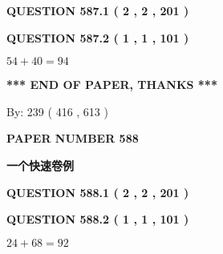 \documentclass{ctexart}
\begin{document}
   
  
\vspace{0.2in}
  
{\textbf{\Large{QUESTION
587.1 
 ( 2 , 2 , 201 )
}}}
  
  
  
\vspace{0.2in}
  
{\textbf{\Large{QUESTION
587.2 
 ( 1 , 1 , 101 )
}}}
  
  
 
 

$ %
54 +  %
40=   %
94$
 
 
   
   
 \vspace{0.2in}
 
   
   
   
   
\vspace{1.0in} 
{\textbf{\large{ *** END OF PAPER, THANKS *** }}} 
   
   
\hspace{1.0in} By: 
 239 ( 416 ,  613 )
   
   
   
   
\newpage 
\setcounter{page}{ 
   588001 } 
   
   
   
   
 {\textbf{ \Large{ PAPER NUMBER  588  }}}
   
   
\vspace{0.2in}
   
   
   
   
   
   
 \vspace{0.2in}
{\LARGE {\textbf{ 一个快速卷例}}}
   
   
  
\vspace{0.2in}
  
{\textbf{\Large{QUESTION
588.1 
 ( 2 , 2 , 201 )
}}}
  
  
  
\vspace{0.2in}
  
{\textbf{\Large{QUESTION
588.2 
 ( 1 , 1 , 101 )
}}}
  
  
 
 

$ %
24 +  %
68=   %
92$
 
 
   
\end{document}
